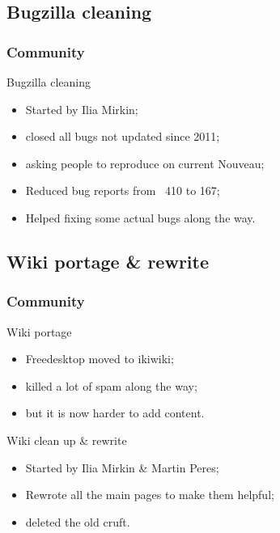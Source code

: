 \documentclass[11pt,english,compress]{beamer}
\begin{document}
\subsection{Bugzilla cleaning}
\begin{frame}
	\frametitle{Community}

	\begin{block}{Bugzilla cleaning}
		\begin{itemize}
			\item Started by Ilia Mirkin;
			\item closed all bugs not updated since 2011;
			\item asking people to reproduce on current Nouveau;
			\item Reduced bug reports from ~410 to 167;
			\item Helped fixing some actual bugs along the way.
		\end{itemize}
	\end{block}
\end{frame}

\subsection{Wiki portage \& rewrite}
\begin{frame}
	\frametitle{Community}

	\begin{block}{Wiki portage}
		\begin{itemize}
			\item Freedesktop moved to ikiwiki;
			\item killed a lot of spam along the way;
			\item but it is now harder to add content.
		\end{itemize}
	\end{block}

	\begin{block}{Wiki clean up \& rewrite}
		\begin{itemize}
			\item Started by Ilia Mirkin \& Martin Peres;
			\item Rewrote all the main pages to make them helpful;
			\item deleted the old cruft.
		\end{itemize}
	\end{block}
\end{frame}
\end{document}
